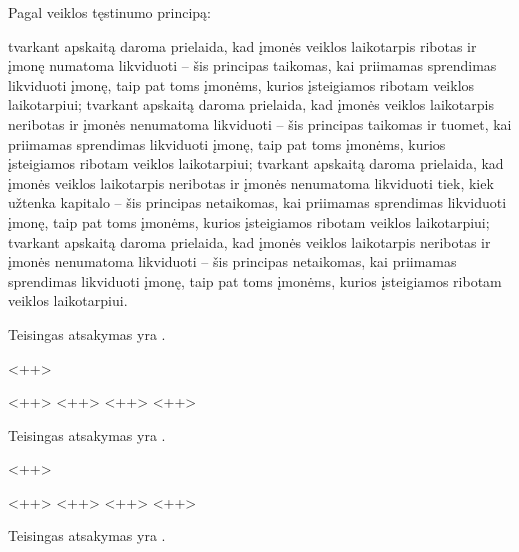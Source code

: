\begin{tasks}
  \begin{task}
    \begin{condition}
      Pagal veiklos tęstinumo principą:
      \begin{enumerate}
         tvarkant apskaitą daroma prielaida, kad įmonės
          veiklos laikotarpis ribotas ir įmonę numatoma likviduoti –
          šis principas taikomas, kai priimamas sprendimas likviduoti
          įmonę, taip pat toms įmonėms, kurios įsteigiamos ribotam
          veiklos laikotarpiui;
         tvarkant apskaitą daroma prielaida, kad įmonės veiklos
          laikotarpis neribotas ir įmonės nenumatoma likviduoti –
          šis principas taikomas ir tuomet, kai priimamas sprendimas
          likviduoti įmonę, taip pat toms įmonėms, kurios įsteigiamos
          ribotam veiklos laikotarpiui;
         tvarkant apskaitą daroma prielaida, kad įmonės
          veiklos laikotarpis neribotas ir įmonės nenumatoma
          likviduoti tiek, kiek užtenka kapitalo – šis principas
          netaikomas, kai priimamas sprendimas likviduoti įmonę,
          taip pat toms įmonėms, kurios įsteigiamos ribotam veiklos
          laikotarpiui;
         tvarkant apskaitą daroma prielaida, kad įmonės
          veiklos laikotarpis neribotas ir įmonės nenumatoma
          likviduoti – šis principas netaikomas, kai priimamas
          sprendimas likviduoti įmonę, taip pat toms įmonėms, kurios
          įsteigiamos ribotam veiklos laikotarpiui.
      \end{enumerate}
    \end{condition}
    \begin{solution}
      Teisingas atsakymas yra .
    \end{solution}
  \end{task}

  \begin{task}
    \begin{condition}
      <++>
      \begin{enumerate}
         <++>
         <++>
         <++>
         <++>
      \end{enumerate}
    \end{condition}
    \begin{solution}
      Teisingas atsakymas yra \tref{<++>}.
    \end{solution}
  \end{task}

  \begin{task}
    \begin{condition}
      <++>
      \begin{enumerate}
         <++>
         <++>
         <++>
         <++>
      \end{enumerate}
    \end{condition}
    \begin{solution}
      Teisingas atsakymas yra \tref{<++>}.
    \end{solution}
  \end{task}


\end{tasks}
